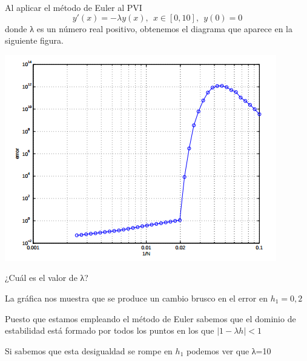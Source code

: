 \begin{problem}[4]
Al aplicar el método de Euler al PVI
\[y'(x) = -λy(x), \ \ x \in [0,10], \ \ y(0)=0\]
donde λ es un número real positivo, obtenemos el diagrama que aparece en la siguiente figura.

\begin{center}
\includegraphics[width=0.8\linewidth]{img/figura_enunciado1.png}
\end{center}

¿Cuál es el valor de λ?

\solution

La gráfica nos muestra que se produce un cambio brusco en el error en $h_1=0,2$

Puesto que estamos empleando el método de Euler sabemos que el dominio de estabilidad está formado por todos los puntos en los que $|1-λh|<1$

Si sabemos que esta desigualdad se rompe en $h_1$ podemos ver que λ=10

\end{problem}

